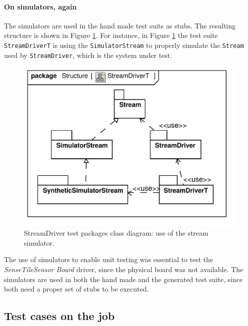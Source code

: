 \documentclass{article}
\newcommand{\lil}[1]{\texttt{\lstinline|#1|}}
\newcommand{\ST}{\emph{SenseTile}\xspace}
\newcommand{\SB}{\emph{Sensor Board}\xspace}
\newcommand{\STSB}{\ST \SB\xspace}
\begin{document}
\paragraph*{On simulators, again}

The simulators are used in the hand made test suits as stubs.
The resulting structure is shown in Figure \ref{fig:class_diagram_streamdriver_test}.  
For instance, in Figure \ref{fig:class_diagram_streamdriver_test} the test suite \lil{StreamDriverT} is using the \lil{SimulatorStream} to properly simulate the \lil{Stream} used by \lil{StreamDriver}, which is the system under test.

\begin{figure}[htb!]
  \centering
  \includegraphics[scale=0.4]{UML_model/Class_Diagram__Structure__StreamDriverT}
  \caption{StreamDriver test packages class diagram: use of the stream
    simulator.}
  \label{fig:class_diagram_streamdriver_test}
\end{figure}

The use of simulators to enable unit testing was essential to test the \STSB driver, since the physical board was not available.
The simulators are used in both the hand made and the generated test suite, since both need a proper set of stubs to be executed.



\subsection{Test cases on the job}
\label{subsec:test_cases_on_the_job}
\end{document}
